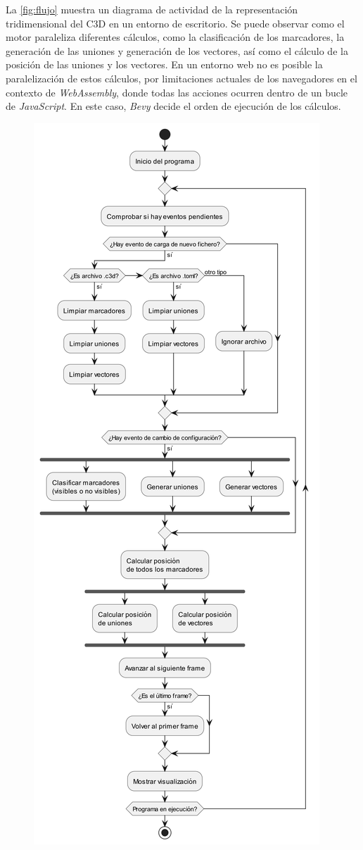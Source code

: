 La \autoref{fig:flujo} muestra un diagrama de actividad de la representación tridimensional del \ac{C3D} en un entorno de escritorio. Se puede observar como el motor paraleliza diferentes cálculos, como la clasificación de los marcadores, la generación de las uniones y generación de los vectores, así como el cálculo de la posición de las uniones y los vectores. En un entorno web no es posible la paralelización de estos cálculos, por limitaciones actuales de los navegadores en el contexto de \textit{WebAssembly}, donde todas las acciones ocurren dentro de un bucle de \textit{JavaScript}. En este caso, \textit{Bevy} decide el orden de ejecución de los cálculos.

\begin{figure}[H]
  \centering
  \includegraphics[height=0.9\textheight, keepaspectratio]{imagenes/diagramas/general.png}

\end{figure}
